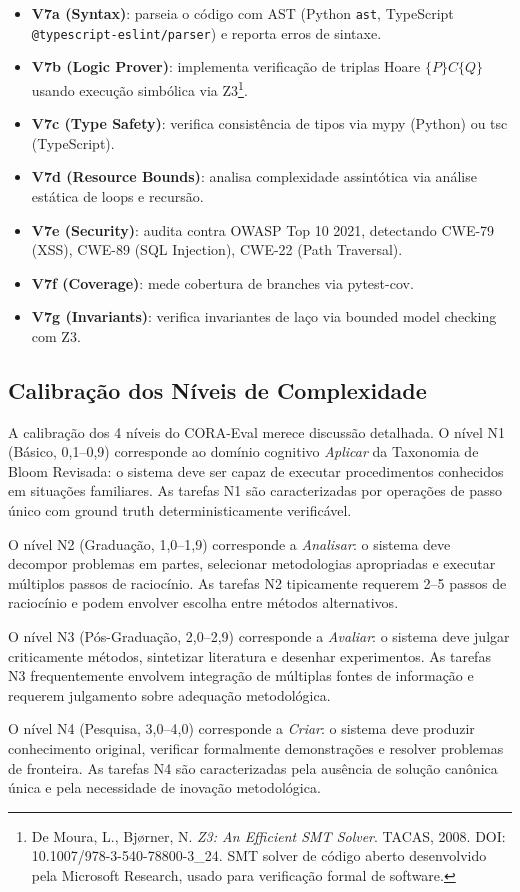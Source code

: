 \begin{itemize}
\item \textbf{V7a (Syntax)}: parseia o código com AST (Python \texttt{ast},
      TypeScript \texttt{@typescript-eslint/parser}) e reporta erros de sintaxe.
\item \textbf{V7b (Logic Prover)}: implementa verificação de triplas Hoare
      $\{P\}C\{Q\}$ usando execução simbólica via Z3\footnote{De Moura, L.,
      Bjørner, N. \textit{Z3: An Efficient SMT Solver}. TACAS, 2008. DOI:
      10.1007/978-3-540-78800-3\_24. SMT solver de código aberto desenvolvido
      pela Microsoft Research, usado para verificação formal de software.}.
\item \textbf{V7c (Type Safety)}: verifica consistência de tipos via mypy
      (Python) ou tsc (TypeScript).
\item \textbf{V7d (Resource Bounds)}: analisa complexidade assintótica via
      análise estática de loops e recursão.
\item \textbf{V7e (Security)}: audita contra OWASP Top 10 2021, detectando
      CWE-79 (XSS), CWE-89 (SQL Injection), CWE-22 (Path Traversal).
\item \textbf{V7f (Coverage)}: mede cobertura de branches via pytest-cov.
\item \textbf{V7g (Invariants)}: verifica invariantes de laço via bounded
      model checking com Z3.
\end{itemize}

\subsection{Calibração dos Níveis de Complexidade}

A calibração dos 4 níveis do CORA-Eval merece discussão detalhada. O nível
N1 (Básico, 0,1--0,9) corresponde ao domínio cognitivo \textit{Aplicar} da
Taxonomia de Bloom Revisada: o sistema deve ser capaz de executar procedimentos
conhecidos em situações familiares. As tarefas N1 são caracterizadas por
operações de passo único com ground truth deterministicamente verificável.

O nível N2 (Graduação, 1,0--1,9) corresponde a \textit{Analisar}: o sistema
deve decompor problemas em partes, selecionar metodologias apropriadas e
executar múltiplos passos de raciocínio. As tarefas N2 tipicamente requerem
2--5 passos de raciocínio e podem envolver escolha entre métodos alternativos.

O nível N3 (Pós-Graduação, 2,0--2,9) corresponde a \textit{Avaliar}: o sistema
deve julgar criticamente métodos, sintetizar literatura e desenhar experimentos.
As tarefas N3 frequentemente envolvem integração de múltiplas fontes de
informação e requerem julgamento sobre adequação metodológica.

O nível N4 (Pesquisa, 3,0--4,0) corresponde a \textit{Criar}: o sistema deve
produzir conhecimento original, verificar formalmente demonstrações e resolver
problemas de fronteira. As tarefas N4 são caracterizadas pela ausência de
solução canônica única e pela necessidade de inovação metodológica.
